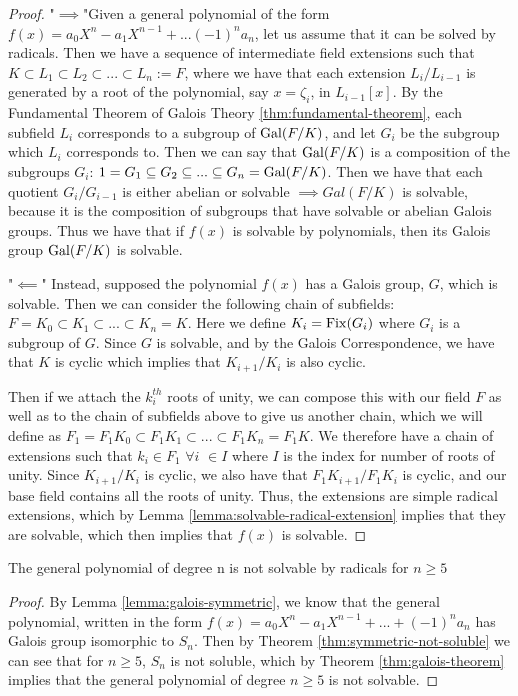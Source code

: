 \begin{proof}
    "$\implies $"Given a general polynomial of the form $f(x) = a_0X^n - a_1X^{n-1}+...(-1)^na_n$, let us assume that it can be solved by radicals. Then we have a sequence of intermediate field extensions such that $K \subset L_1 \subset L_2 \subset ... \subset L_n :=F$, where we have that each extension $L_i/L_{i-1}$ is generated by a root of the polynomial, say $x=\zeta_i$, in $L_{i-1}[x].$
    By the Fundamental Theorem of Galois Theory \ref{thm:fundamental-theorem}, each subfield $L_i$ corresponds to a subgroup of $\operatorname{Gal}(F/K)$, and let $G_i$ be the subgroup which $L_i$ corresponds to. Then we can say that $\operatorname{Gal}(F/K)$ is a composition of the subgroups $G_i$:
    $1=G_1\subseteq G_2 \subseteq ... \subseteq G_n = \operatorname{Gal}(F/K)$. 
    Then we have that each quotient $G_i/G_{i-1}$ is either abelian or solvable $\implies Gal(F/K)$ is solvable, because it is the composition of subgroups that have solvable or abelian Galois groups.
    \newline Thus we have that if $f(x)$ is solvable by polynomials, then its Galois group $\operatorname{Gal}(F/K)$ is solvable.
    

    "$\impliedby$" Instead, supposed the polynomial $f(x)$ has a Galois group, $G$, which is solvable. Then we can consider the following chain of subfields: $F=K_0\subset K_1 \subset ... \subset K_n = K$. Here we define $K_i = \operatorname{Fix}(G_i)$ where $G_i$ is a subgroup of $G$.
    Since $G$ is solvable, and by the Galois Correspondence, we have that $K$ is cyclic which implies that $K_{i+1}/K_i$ is also cyclic.

    Then if we attach the $k_i^{th}$ roots of unity, we can compose this with our field $F$ as well as to the chain of subfields above to give us another chain, which we will define as $F_1 = F_1K_0 \subset F_1K_1 \subset ... \subset F_1K_n = F_1K$. We therefore have a chain of extensions such that $k_i \in F_1$ $\forall i$ \hspace{0.1cm} $\in I $ where $I$ is the index for number of roots of unity. Since $K_{i+1}/K_i$ is cyclic, we also have that $F_1K_{i+1}/F_1K_i$ is cyclic, and our base field contains all the roots of unity. Thus, the extensions are simple radical extensions, which by Lemma \ref{lemma:solvable-radical-extension} implies that they are solvable, which then implies that $f(x)$ is solvable.
\end{proof}

\begin{theorem}\label{thm:abel-ruffini-thm}
    The general polynomial of degree n is not solvable by radicals for $n \ge 5$
\end{theorem}

\begin{proof}
    By Lemma \ref{lemma:galois-symmetric}, we know that the general polynomial, written in the form $f(x)=a_0X^n - a_1X^{n-1} + ... + (-1)^na_n$ has Galois group isomorphic to $S_n$. Then by Theorem \ref{thm:symmetric-not-soluble} we can see that for $n \geq 5$, $S_n$ is not soluble, which by Theorem \ref{thm:galois-theorem} implies that the general polynomial of degree $n \geq 5$ is not solvable.
\end{proof}
